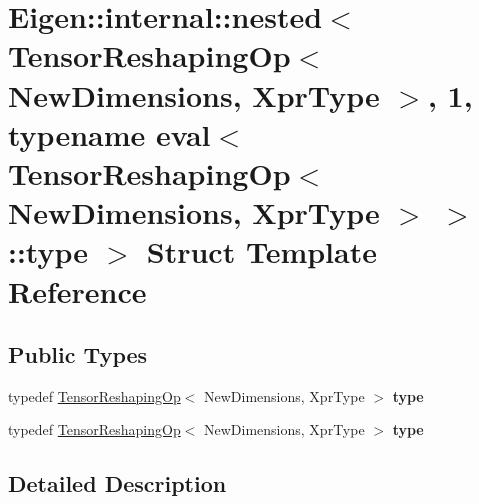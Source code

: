 \hypertarget{struct_eigen_1_1internal_1_1nested_3_01_tensor_reshaping_op_3_01_new_dimensions_00_01_xpr_type_0f8fc83361856d40739eb02dd0bb3ea94}{}\section{Eigen\+:\+:internal\+:\+:nested$<$ Tensor\+Reshaping\+Op$<$ New\+Dimensions, Xpr\+Type $>$, 1, typename eval$<$ Tensor\+Reshaping\+Op$<$ New\+Dimensions, Xpr\+Type $>$ $>$\+:\+:type $>$ Struct Template Reference}
\label{struct_eigen_1_1internal_1_1nested_3_01_tensor_reshaping_op_3_01_new_dimensions_00_01_xpr_type_0f8fc83361856d40739eb02dd0bb3ea94}
\subsection*{Public Types}
\begin{DoxyCompactItemize}
\item 
\mbox{\label{struct_eigen_1_1internal_1_1nested_3_01_tensor_reshaping_op_3_01_new_dimensions_00_01_xpr_type_0f8fc83361856d40739eb02dd0bb3ea94_a8f0e646b6fe8e0d15d5567d397ad372c}} 
typedef \hyperlink{class_eigen_1_1_tensor_reshaping_op}{Tensor\+Reshaping\+Op}$<$ New\+Dimensions, Xpr\+Type $>$ {\bfseries type}
\item 
\mbox{\label{struct_eigen_1_1internal_1_1nested_3_01_tensor_reshaping_op_3_01_new_dimensions_00_01_xpr_type_0f8fc83361856d40739eb02dd0bb3ea94_a8f0e646b6fe8e0d15d5567d397ad372c}} 
typedef \hyperlink{class_eigen_1_1_tensor_reshaping_op}{Tensor\+Reshaping\+Op}$<$ New\+Dimensions, Xpr\+Type $>$ {\bfseries type}
\end{DoxyCompactItemize}


\subsection{Detailed Description}
